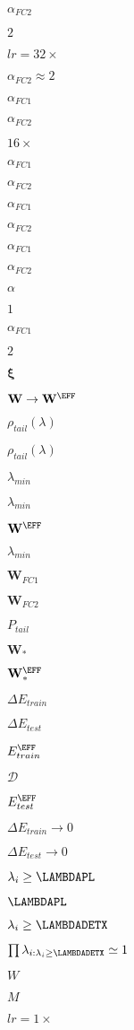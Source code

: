 $\alpha_{FC2}$

$2$

$lr=32\times$

$\alpha_{FC2} \approx 2$

$\alpha_{FC1}$

$\alpha_{FC2}$

$16\times$

$\alpha_{FC1}$

$\alpha_{FC2}$

$\alpha_{FC1}$

$\alpha_{FC2}$

$\alpha_{FC1}$

$\alpha_{FC2}$

$\alpha$

$1$

$\alpha_{FC1}$

$2$


$\boldsymbol{\xi}$

$\mathbf{W}\rightarrow\mathbf{W}^{\EFF}$

$\rho_{tail}(\lambda)$

$\rho_{tail}(\lambda)$

$\lambda_{min}$

$\lambda_{min}$

$\mathbf{W}^{\EFF}$

$\lambda_{min}$

$\mathbf{W}_{FC1}$

$\mathbf{W}_{FC2}$

$P_{tail}$

$\mathbf{W}_*$

$\mathbf{W}^{\EFF}_*$

$\Delta E_{train}$

$\Delta E_{test}$

$E^{\EFF}_{train}$

$\mathcal{D}$

$E^{\EFF}_{test}$

$\Delta E_{train}\to 0$

$\Delta E_{test}\to 0$

$\lambda_i \ge \LAMBDAPL$

$\LAMBDAPL$

$\lambda_{i}\ge \LAMBDADETX$

$\prod\lambda_{i:\lambda_i \ge \LAMBDADETX}\simeq 1$

$W$

$M$

$lr=1\times$

